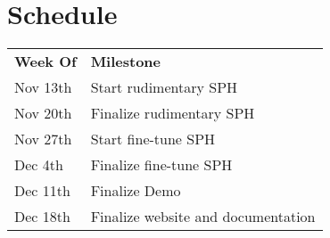 \documentclass[12pt]{article}
\begin{document}
\section{Schedule}

\begin{table}[]
\centering
\label{my-label}
\begin{tabular}{ll}
\textbf{Week Of} & \textbf{Milestone}                 \\
Nov 13th         & Start rudimentary SPH              \\
Nov 20th         & Finalize rudimentary SPH           \\
Nov 27th         & Start fine-tune SPH                \\
Dec 4th          & Finalize fine-tune SPH             \\
Dec 11th         & Finalize Demo                      \\
Dec 18th         & Finalize website and documentation
\end{tabular}
\end{table}
\end{document}
